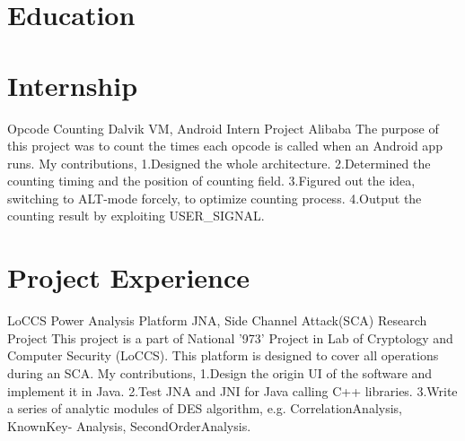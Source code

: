 \documentclass[11pt,a4paper]{moderncv}
\begin{document}
\maketitle

\section{Education}


\section{Internship}
{Opcode Counting}
{Dalvik VM, Android}
{Intern Project}
{Alibaba}
{
The purpose of this project was to count the times each opcode is called when an Android app runs. My contributions,
\newline 1.Designed the whole architecture.
\newline 2.Determined the counting timing and the position of counting field.
\newline 3.Figured out the idea, switching to ALT-mode forcely, to optimize counting process.
\newline 4.Output the counting result by exploiting USER\_SIGNAL.
}

\section{Project Experience}
{LoCCS Power Analysis Platform}
{JNA, Side Channel Attack(SCA)}
{Research Project}{}
{
This project is a part of National ’973’ Project in Lab of Cryptology and Computer Security (LoCCS). This platform is designed to cover all operations during an SCA. My contributions,
\newline 1.Design the origin UI of the software and implement it in Java.
\newline 2.Test JNA and JNI for Java calling C++ libraries.
\newline 3.Write a series of analytic modules of DES algorithm, e.g. CorrelationAnalysis, KnownKey- Analysis, SecondOrderAnalysis.
}
\end{document}
